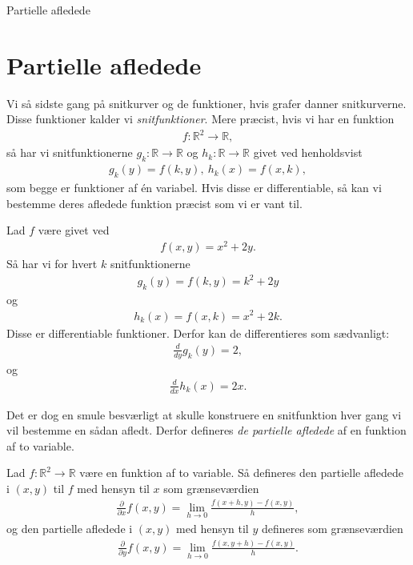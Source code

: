 \begin{center}
\Huge
Partielle afledede
\end{center}

\section*{Partielle afledede}
Vi så sidste gang på snitkurver og de funktioner, hvis grafer danner snitkurverne. Disse funktioner kalder vi \textit{snitfunktioner}. Mere præcist, hvis vi har en funktion 
\begin{align*}
f: \mathbb{R}^2 \to \mathbb{R},
\end{align*}
så har vi snitfunktionerne $g_k : \mathbb{R} \to \mathbb{R}$ og $h_k : \mathbb{R} \to \mathbb{R}$ givet ved henholdsvist
\begin{align*}
g_k(y) = f(k,y), \ h_k(x) = f(x,k),
\end{align*}
som begge er funktioner af én variabel. Hvis disse er differentiable, så kan vi bestemme deres afledede funktion præcist som vi er vant til. 
\begin{exa}
	Lad $f$ være givet ved
	\begin{align*}
		f(x,y) = x^2+2y.
	\end{align*}
	Så har vi for hvert $k$ snitfunktionerne
	\begin{align*}
		g_k(y) = f(k,y) = k^2+2y
	\end{align*}
	og 
	\begin{align*}
		h_k(x) = f(x,k) = x^2+2k.
	\end{align*}
	Disse er differentiable funktioner. Derfor kan de differentieres som sædvanligt:
	\begin{align*}
		\frac{d}{dy} g_k(y) = 2,
	\end{align*}
	og 
	\begin{align*}
		\frac{d}{dx} h_k(x) = 2x.
	\end{align*}
\end{exa}
Det er dog en smule besværligt at skulle konstruere en snitfunktion hver gang vi vil bestemme en sådan afledt. Derfor defineres \textit{de partielle afledede} af en funktion af to variable.
\begin{defn}
	Lad $f:\mathbb{R}^2 \to \mathbb{R}$ være en funktion af to variable. Så defineres den partielle afledede i $(x,y)$ til $f$ med hensyn til $x$ som
	grænseværdien
	\begin{align*}
	\frac{\partial}{\partial x} f(x,y) = \lim_{h\to 0} \frac{f(x+h,y) -f(x,y)}{h},
	\end{align*} og den partielle afledede i $(x,y)$ med hensyn til $y$ defineres som grænseværdien
	\begin{align*}
	\frac{\partial}{\partial y} f(x,y) = \lim_{h\to 0} \frac{f(x,y+h)-f(x,y)}{h}.
	\end{align*}
\end{defn}

